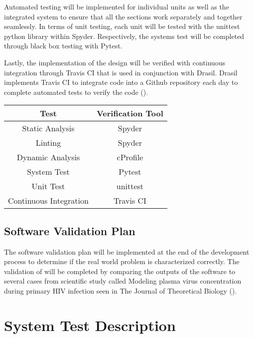 \documentclass[12pt, titlepage]{article}
\begin{document}
Automated testing will be implemented for individual units as well as the 
integrated system to ensure that all the sections work separately and together 
seamlessly. In terms of unit  testing, each unit will be tested with the 
unittest python library within Spyder. Respectively, the systems test will be 
completed through black box testing with Pytest.

Lastly, the implementation of the design will be verified with continuous 
integration through Travis CI that is used in conjunction with Drasil. Drasil 
implements Travis CI to integrate code into a Github repository each day to 
complete automated tests to verify the code (\citet{Drasil}). 

\begin{center}
 \begin{tabular}{||c|c||} 
 \hline
 \textbf{Test} & \textbf{Verification Tool}\\ [0.5ex] 
 \hline
  Static Analysis & Spyder\\
 \hline
  Linting & Spyder\\
 \hline
  Dynamic Analysis & cProfile \\
 \hline
  System Test & Pytest\\
 \hline
  Unit Test & unittest \\
 \hline
  Continuous Integration & Travis CI\\ [1ex] 
 \hline
\end{tabular}
\end{center}		

\newpage

\subsection{Software Validation Plan}

The software validation plan will be implemented at the end of the development 
process to determine if the real world problem is characterized correctly. The 
validation of \progname{} will be completed by comparing the outputs of the 
software to several cases from scientific study called Modeling plasma virus 
concentration during primary HIV infection seen in The Journal of Theoretical 
Biology
(\citet{Stafford2000}).

\section{System Test Description} \label{systestcases}
\end{document}
